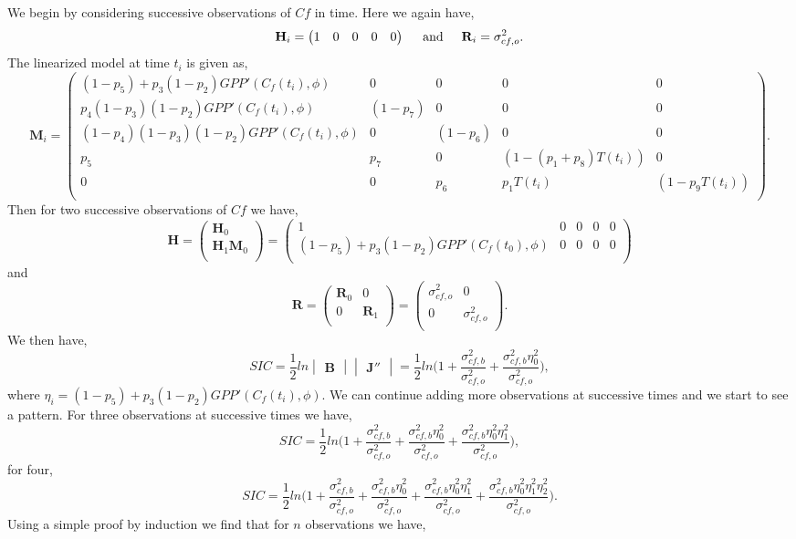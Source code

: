 \documentclass[11pt]{article}
\begin{document}
We begin by considering successive observations of $Cf$ in time. Here we again have,
\[
\textbf{H}_{i} = \begin{pmatrix}
1 & 0 & 0 & 0 & 0
\end{pmatrix}
\hspace{5mm} \text{and} \hspace{5mm}
\textbf{R}_i=\sigma_{cf,o}^{2}.
\] 
The linearized model at time $t_i$ is given as,
\[
\textbf{M}_{i}=
\begin{pmatrix} 
(1-p_5)+p_3(1-p_2)GPP'(C_f(t_i),\phi) & 0 & 0 & 0 & 0 \\
p_4(1-p_3)(1-p_2)GPP'(C_f(t_i),\phi) & (1-p_7) & 0 & 0 & 0 \\
(1-p_4)(1-p_3)(1-p_2)GPP'(C_f(t_i),\phi) & 0 & (1-p_6) & 0 & 0 \\
p_5 & p_7 & 0 & (1-(p_1+p_8)T(t_i)) & 0 \\
0 & 0 & p_6 & p_1T(t_i) & (1-p_9T(t_i)) \\
\end{pmatrix}.
\]
Then for two successive observations of $Cf$ we have,
\[ 
\textbf{H}=
\begin{pmatrix}
\textbf{H}_0 \\
\textbf{H}_1\textbf{M}_0\\
\end{pmatrix}
=
\begin{pmatrix}
1 & 0 & 0 & 0 & 0 \\
(1-p_5)+p_3(1-p_2)GPP'(C_f(t_0),\phi) & 0 & 0 & 0 & 0\\
\end{pmatrix}
\]
and
\[
\textbf{R}=
\begin{pmatrix}
\textbf{R}_0 & 0  \\
0 & \textbf{R}_1  \\
\end{pmatrix}
=
\begin{pmatrix}
\sigma_{cf,o}^{2} & 0  \\
0 & \sigma_{cf,o}^{2}  \\
\end{pmatrix}.
\]
We then have,
\[
SIC = \frac{1}{2}ln\begin{vmatrix} \textbf{B} \end{vmatrix}\begin{vmatrix} \textbf{J}'' \end{vmatrix} =\frac{1}{2}ln \bigg(1+\frac{\sigma_{cf,b}^{2}}{\sigma_{cf,o}^{2}}+\frac{\sigma_{cf,b}^{2}\eta_0^{2}}{\sigma_{cf,o}^{2}} \bigg),
\]
where $\eta_i=(1-p_5)+p_3(1-p_2)GPP'(C_f(t_i),\phi)$. We can continue adding more observations at successive times and we start to see a pattern. For three observations at successive times we have,
\[
SIC =\frac{1}{2}ln \bigg(1+\frac{\sigma_{cf,b}^{2}}{\sigma_{cf,o}^{2}}+\frac{\sigma_{cf,b}^{2}\eta_0^{2}}{\sigma_{cf,o}^{2}}+\frac{\sigma_{cf,b}^{2}\eta_0^{2}\eta_1^{2}}{\sigma_{cf,o}^{2}} \bigg),
\]
for four,
\[
SIC =\frac{1}{2}ln \bigg(1+\frac{\sigma_{cf,b}^{2}}{\sigma_{cf,o}^{2}}+\frac{\sigma_{cf,b}^{2}\eta_0^{2}}{\sigma_{cf,o}^{2}}+\frac{\sigma_{cf,b}^{2}\eta_0^{2}\eta_1^{2}}{\sigma_{cf,o}^{2}}+\frac{\sigma_{cf,b}^{2}\eta_0^{2}\eta_1^{2}\eta_2^{2}}{\sigma_{cf,o}^{2}} \bigg).
\]
Using a simple proof by induction we find that for $n$ observations we have,
\end{document}
